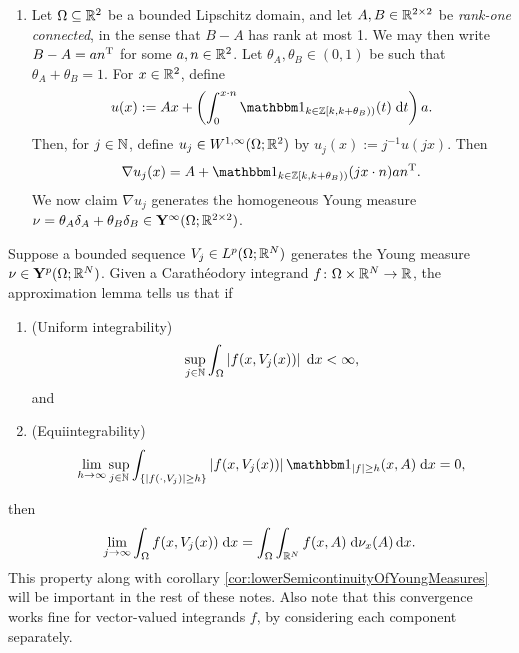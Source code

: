 \begin{example}
\begin{enumerate}[label=(\arabic*)]
        \item Let $\Omega \subseteq \mathbb{R}^2$ be a bounded Lipschitz domain, and let $A,B \in \mathbb{R}^{2 \times 2}$ be \textit{rank-one connected}, in the sense that $B-A$ has rank at most 1. We may then write $B - A = an^{\mathrm{T}}$ for some $a,n \in \mathbb{R}^2$. Let $\theta_A, \theta_B \in (0,1)$ be such that $\theta_A + \theta_B = 1$. For $x \in \mathbb{R}^2$, define 
        \begin{equation}
            u(x) := Ax + \parens{ \int_0^{x \cdot n} \bbone_{{k \in \bbZ} [k,k+\theta_B))}(t) \; \d t } a.
        \end{equation}
        Then, for $j \in \mathbb{N}$, define $u_j \in W^{1,\infty}(\Omega;\mathbb{R}^2)$ by $u_j(x) := j^{-1} u(jx)$. Then 
        \begin{equation}
            \nabla u_j(x) = A + \bbone_{{k \in \bbZ} [k,k+\theta_B))}(jx \cdot n) an^\T.
        \end{equation}
        We now claim $\nabla u_j$ generates the homogeneous Young measure $\nu = \theta_A \delta_A + \theta_B \delta_B \in \mathbf{Y}^\infty(\Omega;\mathbb{R}^{2 \times 2})$.
    \end{enumerate}
\end{example}

Suppose a bounded sequence $V_j \in L^p(\Omega;\mathbb{R}^N)$ generates the Young measure $\nu \in \mathbf{Y}^p(\Omega;\mathbb{R}^N)$. Given a Carath\'eodory integrand $f \colon \Omega \times \mathbb{R}^N \to \mathbb{R}$, the approximation lemma tells us that if 
\begin{enumerate}[label=(\roman*)]
    \item (Uniform integrability)
    \begin{equation}
        \sup_{j \in \mathbb{N}} \int_\Omega \left\lvert {f(x,V_j(x))} \right\rvert \; \mathrm{d} x < \infty,
    \end{equation}
    and 
    \item (Equiintegrability)
    \begin{equation}
        \lim_{h \to \infty} \sup_{j \in \bbN} \int_{\set{\abs{f(\cdot,V_j)} \geq h}} \abs{f(x,V_j(x))} \bbone_{\abs{f} \geq h}(x,A) \; \d x = 0,
    \end{equation}
\end{enumerate}
then
\begin{equation}
    \lim_{j \to \infty} \int_\Omega f(x,V_j(x)) \; \mathrm{d} x = \int_\Omega \int_{\mathbb{R}^N} f(x,A) \; \mathrm{d}\nu_x(A) \, \mathrm{d} x.
\end{equation}
This property along with corollary \ref{cor:lowerSemicontinuityOfYoungMeasures} will be important in the rest of these notes. Also note that this convergence works fine for vector-valued integrands $f$, by considering each component separately.

